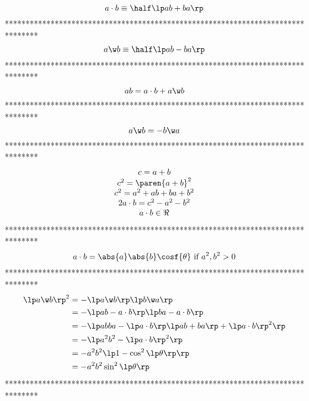 \begin{equation}\label{EQ1_1}
a\cdot b \equiv \half\lp ab+ba \rp
\end{equation}
********************************************************************************
\begin{equation}\label{EQ1_2}
a\w b \equiv \half\lp ab-ba \rp
\end{equation}
********************************************************************************
\begin{equation}\label{EQ1_3}
ab = a\cdot b+a\w b
\end{equation}
********************************************************************************
\begin{equation}\label{EQ1_4}
a\w b = -b\w a
\end{equation}
********************************************************************************
\begin{equation}\label{EQ1_5}
\begin{array}{c}
c = a+b \\
c^{2} = \paren{a+b}^{2} \\
c^{2} = a^{2}+ab+ba+b^{2} \\
2a\cdot b = c^{2}-a^{2}-b^{2} \\
a \cdot b \in \Re
\end{array}
\end{equation}
********************************************************************************
\begin{equation}\label{EQ1_6}
a \cdot b = \abs{a}\abs{b}\cosf{\theta} \mbox{ if } a^{2},b^{2}> 0
\end{equation}
********************************************************************************
\begin{align}
\lp a\w b \rp^{2} &= -\lp a\w b \rp\lp b\w a \rp \label{EQ1_7} \\
                  &= -\lp ab - a\cdot b \rp\lp ba - a\cdot b \rp \label{EQ1_8} \\
                  &= -\lp abba -\lp a\cdot b\rp\lp ab+ba \rp + \lp a\cdot b \rp^{2}\rp \label{EQ1_9} \\
                  &= -\lp a^{2}b^{2} - \lp a\cdot b \rp^{2}\rp \label{EQ1_10} \\
                  &= - a^{2}b^{2}\lp 1 - \cos^{2}\lp\theta \rp \rp \label{EQ1_11} \\
                  &= - a^{2}b^{2}\sin^{2}\lp\theta \rp\label{EQ1_12}
\end{align}
********************************************************************************
